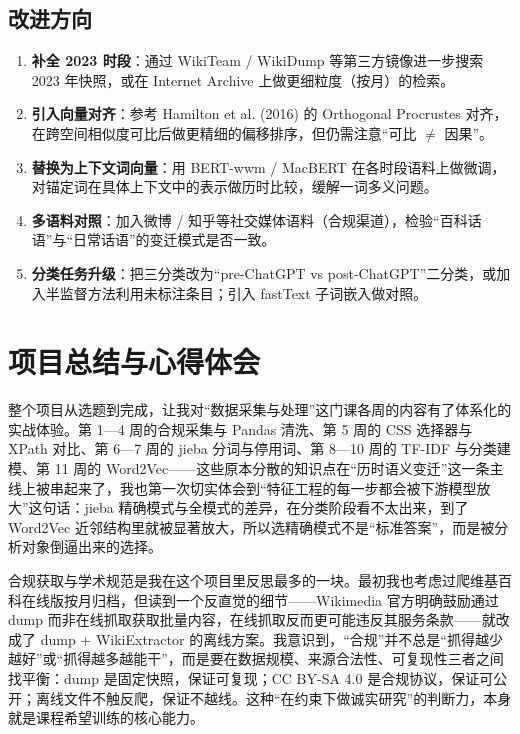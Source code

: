 \documentclass[12pt,a4paper]{article}
\begin{document}
\subsection{改进方向}

\begin{enumerate}[leftmargin=2em,itemsep=2pt]
  \item \textbf{补全 2023 时段}：通过 WikiTeam / WikiDump 等第三方镜像进一步搜索 2023 年快照，或在 Internet Archive 上做更细粒度（按月）的检索。
  \item \textbf{引入向量对齐}：参考 Hamilton et al. (2016) 的 Orthogonal Procrustes 对齐，在跨空间相似度可比后做更精细的偏移排序，但仍需注意“可比 $\neq$ 因果”。
  \item \textbf{替换为上下文词向量}：用 BERT-wwm / MacBERT 在各时段语料上做微调，对锚定词在具体上下文中的表示做历时比较，缓解一词多义问题。
  \item \textbf{多语料对照}：加入微博 / 知乎等社交媒体语料（合规渠道），检验“百科话语”与“日常话语”的变迁模式是否一致。
  \item \textbf{分类任务升级}：把三分类改为“pre-ChatGPT vs post-ChatGPT”二分类，或加入半监督方法利用未标注条目；引入 fastText 子词嵌入做对照。
\end{enumerate}

\section{项目总结与心得体会}

整个项目从选题到完成，让我对“数据采集与处理”这门课各周的内容有了体系化的实战体验。第 1—4 周的合规采集与 Pandas 清洗、第 5 周的 CSS 选择器与 XPath 对比、第 6—7 周的 jieba 分词与停用词、第 8—10 周的 TF-IDF 与分类建模、第 11 周的 Word2Vec——这些原本分散的知识点在“历时语义变迁”这一条主线上被串起来了，我也第一次切实体会到“特征工程的每一步都会被下游模型放大”这句话：jieba 精确模式与全模式的差异，在分类阶段看不太出来，到了 Word2Vec 近邻结构里就被显著放大，所以选精确模式不是“标准答案”，而是被分析对象倒逼出来的选择。

合规获取与学术规范是我在这个项目里反思最多的一块。最初我也考虑过爬维基百科在线版按月归档，但读到一个反直觉的细节——Wikimedia 官方明确鼓励通过 dump 而非在线抓取获取批量内容，在线抓取反而更可能违反其服务条款——就改成了 dump + WikiExtractor 的离线方案。我意识到，“合规”并不总是“抓得越少越好”或“抓得越多越能干”，而是要在数据规模、来源合法性、可复现性三者之间找平衡：dump 是固定快照，保证可复现；CC BY-SA 4.0 是合规协议，保证可公开；离线文件不触反爬，保证不越线。这种“在约束下做诚实研究”的判断力，本身就是课程希望训练的核心能力。
\end{document}
